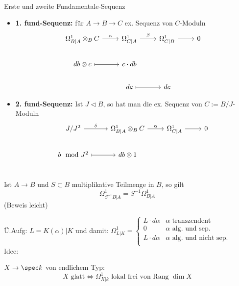 \begin{thm}{Erste und zweite Fundamentale-Sequenz}
  \begin{itemize}
    \item \textbf{1. fund-Sequenz:}
      für $A\rightarrow B\rightarrow C$ ex. Sequenz von $C$-Moduln
      \[\begin{tikzcd}
        \Omega_{B|A}^1\otimes_BC\rar{\alpha} & \Omega_{C|A}^1 \rar{\beta}
          & \Omega_{C|B}^1 \rar & 0\\
          db\otimes c \rar[mapsto] & c\cdot db\\
                                   & dc \rar[mapsto] & dc
      \end{tikzcd}\]
    \item \textbf{2. fund-Sequenz:} Ist $J\vartriangleleft B$, so hat man die
    ex. Sequenz von $C:=B/J$-Moduln
      \[\begin{tikzcd}
        J/J^2 \rar{\delta} & \Omega_{B|A}^1\otimes_BC\rar{\alpha} 
          & \Omega_{C|A}^1 \rar & 0\\
          b\mod J^2 \rar[mapsto] & db\otimes 1 \\
      \end{tikzcd}\]
  \end{itemize}
\end{thm}
\begin{lem}
Ist $A\rightarrow B$ und $S\subset B$ multiplikative Teilmenge in $B$, so gilt
\[
\Omega_{S^{-1}B|A}^1=S^{-1}\Omega_{B|A}^1
\]
(Beweis leicht)
\end{lem}
Ü.Aufg: $L=K(\alpha)|K$ und damit: $\Omega_{L|K}^1=\begin{cases}
L\cdot d\alpha & \text{$\alpha$ transzendent}\\
0 & \text{$\alpha$ alg. und sep.}\\
L\cdot d\alpha & \text{$\alpha$ alg. und nicht sep.}\\
\end{cases}$\\
Idee: \TODO
\begin{bem}
$X\rightarrow \spec k$ von endlichem Typ:
\[
X\text{ glatt}\Leftrightarrow\Omega_{X|k}^1\text{ lokal frei von Rang $\dim X$}
\]
\end{bem}
